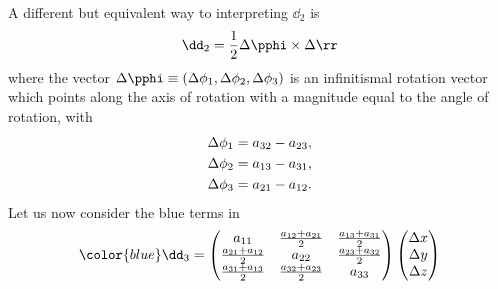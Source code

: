 A different but equivalent way to interpreting $\dd_2$ is 
\begin{equation}
\dd_2 = \frac{1}{2}\Delta \pphi \times \Delta \rr
\label{eq:rot}
\end{equation}
where the vector $\Delta \pphi \equiv (\Delta \phi_1,\Delta
\phi_2,\Delta \phi_3)$ is an infinitismal rotation vector
which points along the axis of rotation with a magnitude equal to the 
angle of rotation, with 
\begin{subequations}
\begin{align}
\Delta \phi_1 & =  a_{32}-a_{23} \/, \\
\Delta \phi_2 & =  a_{13}-a_{31} \/,\\
\Delta \phi_3 & =  a_{21}-a_{12} \/.
\end{align}
\end{subequations}
Let us now consider the blue terms in 
\begin{equation}
{\color{blue}\dd_3 = 
\begin{pmatrix}
a_{11} & \frac{a_{12}+a_{21}}{2} &
    \frac{a_{13}+a_{31}}{2}  \\
\frac{a_{21}+a_{12}}{2} &  a_{22} &
    \frac{a_{23}+a_{32}}{2}  \\
\frac{a_{31}+a_{13}}{2} &
    \frac{a_{32}+a_{23}}{2} & a_{33} 
\end{pmatrix}
\begin{pmatrix}
\Delta x \\ \Delta y  \\ \Delta z
\end{pmatrix}
}
\label{eq:sym}
\end{equation}

